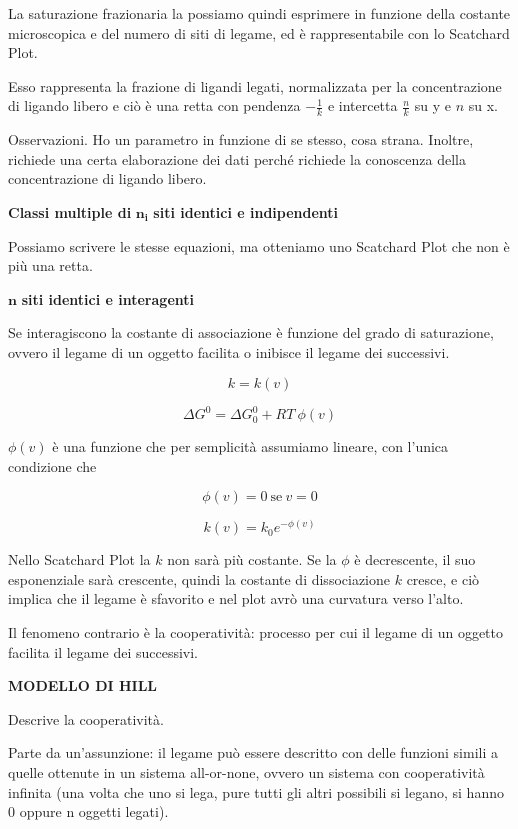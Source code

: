 La saturazione frazionaria la possiamo quindi esprimere in funzione
della costante microscopica e del numero di siti di legame, ed è
rappresentabile con lo Scatchard Plot.

Esso rappresenta la frazione di ligandi legati, normalizzata per la
concentrazione di ligando libero e ciò è una retta con pendenza
\(- \frac{1}{k}\) e intercetta \(\frac{n}{k}\) su y e \(n\) su x.

Osservazioni. Ho un parametro in funzione di se stesso, cosa strana.
Inoltre, richiede una certa elaborazione dei dati perché richiede la
conoscenza della concentrazione di ligando libero.

\textbf{Classi multiple di} \(\mathbf{n}_{\mathbf{i}}\) \textbf{siti
identici e indipendenti}

Possiamo scrivere le stesse equazioni, ma otteniamo uno Scatchard Plot
che non è più una retta.

\(\mathbf{n}\) \textbf{siti identici e interagenti}

Se interagiscono la costante di associazione è funzione del grado di
saturazione, ovvero il legame di un oggetto facilita o inibisce il
legame dei successivi.

\[k = k(v)\]

\[\Delta G^{0} = \Delta G_{0}^{0} + RT\ \phi(v)\]

\(\phi(v)\) è una funzione che per semplicità assumiamo lineare, con
l'unica condizione che

\[\phi\left( v \right) = 0\ \text{se}\ v = 0\]

\[k\left( v \right) = k_{0}e^{- \phi\left( v \right)}\]

Nello Scatchard Plot la \(k\) non sarà più costante. Se la \(\phi\) è
decrescente, il suo esponenziale sarà crescente, quindi la costante di
dissociazione \(k\) cresce, e ciò implica che il legame è sfavorito e
nel plot avrò una curvatura verso l'alto.

Il fenomeno contrario è la cooperatività: processo per cui il legame di
un oggetto facilita il legame dei successivi.

\textbf{MODELLO DI HILL}

Descrive la cooperatività.

Parte da un'assunzione: il legame può essere descritto con delle
funzioni simili a quelle ottenute in un sistema all-or-none, ovvero un
sistema con cooperatività infinita (una volta che uno si lega, pure
tutti gli altri possibili si legano, si hanno 0 oppure n oggetti
legati).

